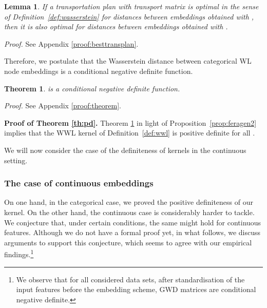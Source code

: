 \documentclass{article}
\newtheorem{theorem}{Theorem}
\newtheorem{lemma}{Lemma}\newtheorem{conjecture}{Conjecture}
\begin{document}
\begin{lemma}
\label{lemma:besttransplan}
  If a transportation plan  with transport matrix  is optimal in the sense of Definition~\ref{def:wasserstein} for distances  between embeddings obtained with , then it is also optimal for distances  between embeddings obtained with .
\end{lemma}
\textit{Proof.} See Appendix \ref{proof:besttransplan}.

Therefore, we postulate that the Wasserstein distance between categorical WL node embeddings is a conditional negative definite function.
\begin{theorem} 
\label{th:neg}
 is a conditional negative definite function.
\end{theorem}
\textit{Proof.} See Appendix \ref{proof:theorem}.

\textbf{Proof of Theorem \ref{th:pd}.}
Theorem \ref{th:neg} in light of Proposition~\ref{prop:feragen2} implies that the WWL kernel of Definition~\ref{def:wwl} is positive definite for all . \hfill 

We will now consider the case of the definiteness of kernels in the continuous setting. 

\subsubsection{The case of continuous embeddings}\label{sec:Continuous embeddings}

On one hand, in the categorical case, we proved the positive definiteness of our kernel. On the other hand, the continuous case is considerably harder to tackle.
We conjecture that, under certain conditions, the same might hold for continuous features. 
Although we do not have a formal proof yet, in what follows, we discuss arguments to support this conjecture, which seems to agree with our empirical findings.\footnote{We observe that for all considered data sets, after standardisation of the input features before the embedding scheme, GWD matrices are conditional negative definite.}
\end{document}
